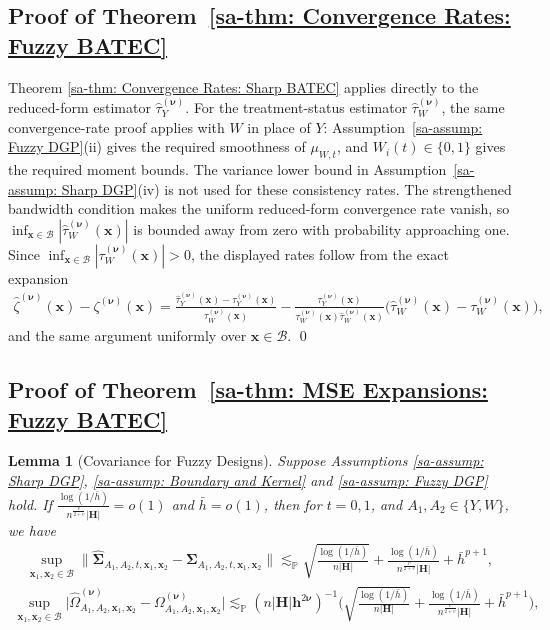 \documentclass[10pt]{article}
\newtheorem{lem}{Lemma}
\newcommand{\lessp}{\lesssim_{\mathbb{P}}}
\newcommand{\bh}{\mathbf{h}}
\newcommand{\bH}{\mathbf{H}}
\newcommand{\bx}{\mathbf{x}}
\newcommand{\bnu}{\boldsymbol{\nu}}
\newcommand{\bSigma}{\boldsymbol{\Sigma}}
\newcommand{\B}{\mathcal{B}}
\begin{document}
\subsection{Proof of Theorem~\ref{sa-thm: Convergence Rates: Fuzzy BATEC}}

Theorem \ref{sa-thm: Convergence Rates: Sharp BATEC} applies directly to the reduced-form estimator $\widehat{\tau}^{(\bnu)}_Y$. For the treatment-status estimator $\widehat{\tau}^{(\bnu)}_W$, the same convergence-rate proof applies with $W$ in place of $Y$: Assumption~\ref{sa-assump: Fuzzy DGP}(ii) gives the required smoothness of $\mu_{W,t}$, and $W_i(t)\in\{0,1\}$ gives the required moment bounds. The variance lower bound in Assumption~\ref{sa-assump: Sharp DGP}(iv) is not used for these consistency rates. The strengthened bandwidth condition makes the uniform reduced-form convergence rate vanish, so $\inf_{\bx\in\B}|\widehat{\tau}_W^{(\bnu)}(\bx)|$ is bounded away from zero with probability approaching one. Since $\inf_{\bx\in\B}|\tau_W^{(\bnu)}(\bx)|>0$, the displayed rates follow from the exact expansion
\begin{align*}
    \widehat{\zeta}^{(\bnu)}(\bx) - \zeta^{(\bnu)}(\bx)
    = \frac{\widehat{\tau}^{(\bnu)}_Y(\bx)-\tau^{(\bnu)}_Y(\bx)}{\tau_W^{(\bnu)}(\bx)}
      - \frac{\tau_Y^{(\bnu)}(\bx)}{\tau_W^{(\bnu)}(\bx)\widehat{\tau}_W^{(\bnu)}(\bx)}
        \big(\widehat{\tau}^{(\bnu)}_W(\bx)-\tau^{(\bnu)}_W(\bx)\big),
\end{align*}
and the same argument uniformly over $\bx\in\B$.
\qed



\subsection{Proof of Theorem~\ref{sa-thm: MSE Expansions: Fuzzy BATEC}}

\begin{lem}[Covariance for Fuzzy Designs]\label{sa-lem: covariance for fuzzy designs}
    Suppose Assumptions \ref{sa-assump: Sharp DGP}, \ref{sa-assump: Boundary and Kernel} and \ref{sa-assump: Fuzzy DGP} hold. If $\frac{\log(1/\bar{h})}{n^{\frac{v}{2+v}} |\bH|} = o(1)$ and $\bar{h}=o(1)$, then for $t = 0,1$, and $A_1, A_2 \in \{Y, W\}$, we have
    \begin{align*}
        \sup_{\bx_1,\bx_2 \in \B} \big\|\widehat{\bSigma}_{A_1,A_2,t,\bx_1,\bx_2} - \bSigma_{A_1,A_2,t,\bx_1,\bx_2}\big\|
        \lessp \sqrt{\frac{\log(1/\bar{h})}{n |\bH|}} + \frac{\log(1/\bar{h})}{n^{\frac{v}{2+v}}|\bH|} + \bar{h}^{p+1},
    \end{align*}
    \begin{align*}
        \sup_{\bx_1,\bx_2 \in \B} \big|\widehat{\Omega}_{A_1, A_2, \bx_1,\bx_2}^{(\bnu)} - \Omega_{A_1, A_2, \bx_1,\bx_2}^{(\bnu)}\big|
        \lessp (n |\bH|\bh^{2\bnu})^{-1}\bigg(\sqrt{\frac{\log(1/\bar{h})}{n |\bH|}} + \frac{\log(1/\bar{h})}{n^{\frac{v}{2+v}}|\bH|}+ \bar{h}^{p+1}\bigg),
    \end{align*}
\end{lem}
\end{document}

